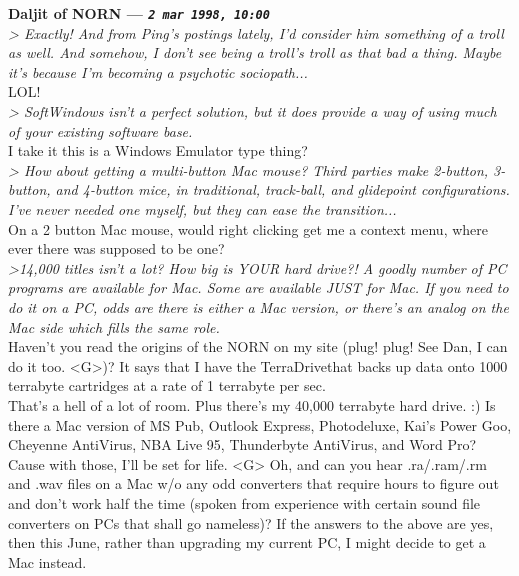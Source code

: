 \documentclass[11pt,twoside,a4paper]{article}
\begin{document}
\begin{multicols*}{2}
 
		
	
		
\textbf{Daljit of NORN --- \emph{\texttt{2 mar 1998, 10:00}}}~\\

\emph{> Exactly! And from Ping's postings lately, I'd consider him something of a troll as well. And somehow, I don't see being a troll's troll as that bad a thing. Maybe it's because I'm becoming a psychotic sociopath...}~\\

LOL!~\\

\emph{> SoftWindows isn't a perfect solution, but it does provide a way of using much of your existing software base.}~\\

I take it this is a Windows Emulator type thing?~\\

\emph{> How about getting a multi-button Mac mouse? Third parties make 2-button, 3-button, and 4-button mice, in traditional, track-ball, and glidepoint configurations. I've never needed one myself, but they can ease the transition...}~\\

On a 2 button Mac mouse, would right clicking get me a context menu, where ever there was supposed to be one?~\\

\emph{>14,000 titles isn't a lot? How big is YOUR hard drive?! A goodly number of PC programs are available for Mac. Some are available JUST for Mac. If you need to do it on a PC, odds are there is either a Mac version, or there's an analog on the Mac side which fills the same role.}~\\

Haven't you read the origins of the NORN on my site (plug! plug! See Dan, I can do it too.  <G>)?  It says that I have the TerraDrive\texttrademark  that backs up data onto 1000 terrabyte cartridges at a rate of 1 terrabyte per sec.~\\ 
That's a hell of a lot of room.  Plus there's my 40,000 terrabyte hard drive.  :)  Is there a Mac version of MS Pub, Outlook Express, Photodeluxe, Kai's Power Goo, Cheyenne AntiVirus, NBA Live 95, Thunderbyte AntiVirus, and Word Pro?  Cause with those, I'll be set for life.  <G>  Oh, and can you hear .ra/.ram/.rm and .wav files on a Mac w/o any odd converters that require hours to figure out and don't work half the time (spoken from experience with certain sound file converters on PCs that shall go nameless)?  If the answers to the above are yes, then this June, rather than upgrading my current PC, I might decide to get a Mac instead.~\\


\end{multicols*}
\end{document}

